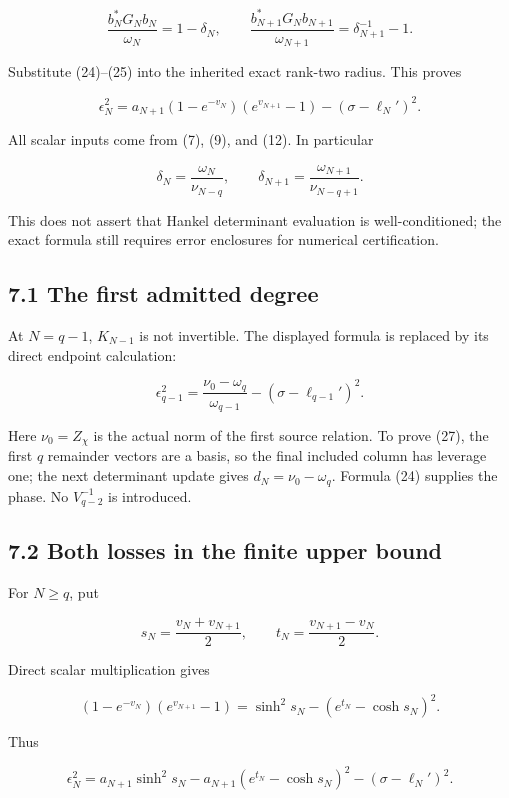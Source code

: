 \documentclass[
  11pt,
]{article}
\begin{document}
\[
\frac{b_N^*G_Nb_N}{\omega_N}=1-\delta_N,
\qquad
\frac{b_{N+1}^*G_Nb_{N+1}}{\omega_{N+1}}=\delta_{N+1}^{-1}-1.
\tag{25}
\]

Substitute (24)--(25) into the inherited exact rank-two radius. This
proves

\[
\boxed{
\epsilon_N^2=a_{N+1}(1-e^{-v_N})(e^{v_{N+1}}-1)-(\sigma-\ell_N')^2.
}
\tag{26}
\]

All scalar inputs come from (7), (9), and (12). In particular

\[
\delta_N=\frac{\omega_N}{\nu_{N-q}},\qquad
\delta_{N+1}=\frac{\omega_{N+1}}{\nu_{N-q+1}}.
\]

This does not assert that Hankel determinant evaluation is
well-conditioned; the exact formula still requires error enclosures for
numerical certification.

\subsection{7.1 The first admitted
degree}\label{the-first-admitted-degree}

At \(N=q-1\), \(K_{N-1}\) is not invertible. The displayed formula is
replaced by its direct endpoint calculation:

\[
\boxed{
\epsilon_{q-1}^2
=\frac{\nu_0-\omega_q}{\omega_{q-1}}
-(\sigma-\ell_{q-1}')^2.
}
\tag{27}
\]

Here \(\nu_0=Z_\chi\) is the actual norm of the first source relation.
To prove (27), the first \(q\) remainder vectors are a basis, so the
final included column has leverage one; the next determinant update
gives \(d_N=\nu_0-\omega_q\). Formula (24) supplies the phase. No
\(V_{q-2}^{-1}\) is introduced.

\subsection{7.2 Both losses in the finite upper
bound}\label{both-losses-in-the-finite-upper-bound}

For \(N\ge q\), put

\[
s_N=\frac{v_N+v_{N+1}}2,\qquad t_N=\frac{v_{N+1}-v_N}2.
\]

Direct scalar multiplication gives

\[
(1-e^{-v_N})(e^{v_{N+1}}-1)
=\sinh^2s_N-(e^{t_N}-\cosh s_N)^2.
\]

Thus

\[
\boxed{
\epsilon_N^2=a_{N+1}\sinh^2s_N
-a_{N+1}(e^{t_N}-\cosh s_N)^2
-(\sigma-\ell_N')^2.
}
\tag{28}
\]
\end{document}
